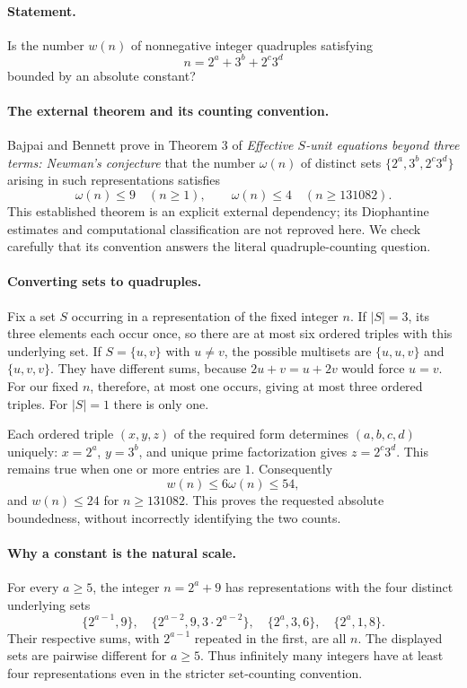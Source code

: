 \paragraph{Statement.}
Is the number \(w(n)\) of nonnegative integer quadruples satisfying
\[
 n=2^a+3^b+2^c3^d
\]
bounded by an absolute constant?

\paragraph{The external theorem and its counting convention.}
Bajpai and Bennett prove in Theorem 3 of
\emph{Effective \(S\)-unit equations beyond three terms: Newman's
conjecture} that the number \(\omega(n)\) of distinct sets
\(\{2^a,3^b,2^c3^d\}\) arising in such representations satisfies
\[
 \omega(n)\leq9\quad(n\geq1),\qquad
 \omega(n)\leq4\quad(n\geq131082).
 \tag{1}
\]
This established theorem is an explicit external dependency; its
Diophantine estimates and computational classification are not reproved
here. We check carefully that its convention answers the literal
quadruple-counting question.

\paragraph{Converting sets to quadruples.}
Fix a set \(S\) occurring in a representation of the fixed integer \(n\).
If \(|S|=3\), its three elements each occur once, so there are at most
six ordered triples with this underlying set.
If \(S=\{u,v\}\) with \(u\ne v\), the possible multisets are
\(\{u,u,v\}\) and \(\{u,v,v\}\). They have different sums, because
\(2u+v=u+2v\) would force \(u=v\). For our fixed \(n\), therefore,
at most one occurs, giving at most three ordered triples.
For \(|S|=1\) there is only one.

Each ordered triple \((x,y,z)\) of the required form determines
\((a,b,c,d)\) uniquely: \(x=2^a\), \(y=3^b\), and unique prime
factorization gives \(z=2^c3^d\). This remains true when one or more
entries are \(1\). Consequently
\[
 w(n)\leq6\omega(n)\leq54,
 \tag{2}
\]
and \(w(n)\leq24\) for \(n\geq131082\). This proves the requested
absolute boundedness, without incorrectly identifying the two counts.

\paragraph{Why a constant is the natural scale.}
For every \(a\geq5\), the integer \(n=2^a+9\) has representations with
the four distinct underlying sets
\[
 \{2^{a-1},9\},\quad
 \{2^{a-2},9,3\cdot2^{a-2}\},\quad
 \{2^a,3,6\},\quad
 \{2^a,1,8\}.
\]
Their respective sums, with \(2^{a-1}\) repeated in the first, are all
\(n\). The displayed sets are pairwise different for \(a\geq5\).
Thus infinitely many integers have at least four representations
even in the stricter set-counting convention.

